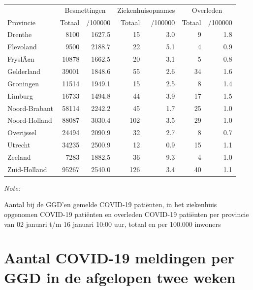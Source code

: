 \documentclass[
  english,
  man,floatsintext]{apa6}
\begin{document}
\begin{table}
\centering
\begin{threeparttable}
\begin{tabular}{lrrrrrr}
\toprule
\multicolumn{1}{c}{ } & \multicolumn{2}{c}{Besmettingen} & \multicolumn{2}{c}{Ziekenhuisopnames} & \multicolumn{2}{c}{Overleden} \\
\cmidrule(l{3pt}r{3pt}){2-3} \cmidrule(l{3pt}r{3pt}){4-5} \cmidrule(l{3pt}r{3pt}){6-7}
Provincie & Totaal & /100000 & Totaal & /100000 & Totaal & /100000\\
\midrule
Drenthe & 8100 & 1627.5 & 15 & 3.0 & 9 & 1.8\\
Flevoland & 9500 & 2188.7 & 22 & 5.1 & 4 & 0.9\\
FryslÃ¢n & 10878 & 1662.5 & 20 & 3.1 & 5 & 0.8\\
Gelderland & 39001 & 1848.6 & 55 & 2.6 & 34 & 1.6\\
Groningen & 11514 & 1949.1 & 15 & 2.5 & 8 & 1.4\\
Limburg & 16733 & 1494.8 & 44 & 3.9 & 17 & 1.5\\
Noord-Brabant & 58114 & 2242.2 & 45 & 1.7 & 25 & 1.0\\
Noord-Holland & 88087 & 3030.4 & 102 & 3.5 & 29 & 1.0\\
Overijssel & 24494 & 2090.9 & 32 & 2.7 & 8 & 0.7\\
Utrecht & 34235 & 2500.9 & 12 & 0.9 & 15 & 1.1\\
Zeeland & 7283 & 1882.5 & 36 & 9.3 & 4 & 1.0\\
Zuid-Holland & 95267 & 2540.0 & 126 & 3.4 & 40 & 1.1\\
\bottomrule
\end{tabular}
\begin{tablenotes}
\item \textit{Note: } 
\item Aantal bij de GGD’en gemelde COVID-19 patiënten, in het ziekenhuis opgenomen COVID-19 patiënten en overleden COVID-19 patiënten per provincie van 02 januari t/m 16 januari 10:00 uur, totaal en per 100.000 inwoners
\end{tablenotes}
\end{threeparttable}
\end{table}

\newpage

\hypertarget{aantal-covid-19-meldingen-per-ggd-in-de-afgelopen-twee-weken}{%
\section{Aantal COVID-19 meldingen per GGD in de afgelopen twee weken}\label{aantal-covid-19-meldingen-per-ggd-in-de-afgelopen-twee-weken}}
\end{document}
